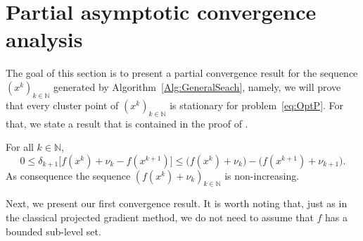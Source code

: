 \section{Partial asymptotic convergence analysis} \label{Sec:PartialConvRes}
The goal  of this section is to present a partial  convergence result for  the sequence $(x^k)_{k\in\mathbb{N}}$ generated by Algorithm~\ref{Alg:GeneralSeach}, namely, we will prove that every cluster point of $(x^k)_{k\in\mathbb{N}}$ is stationary for problem~\eqref{eq:OptP}.  For that, we state a result that is contained in the proof of \cite[Theorem 4]{GrapigliaSachs2017}.
\begin{lemma} \label{le:fkvk}
	For all $k \in \mathbb{N}$,   
	$$
	  0\leq \delta_{k+1}\big[ f(x^{k})+\nu_{k}-  f(x^{k+1})\big] \leq \big( f(x^{k})+\nu_{k}\big) - \big( f(x^{k+1})+\nu_{k+1}\big).
	$$ 
	As consequence the sequence   $\left(f(x^k)+\nu_k\right)_{k\in\mathbb{N}}$ is    non-increasing.
\end{lemma}

Next, we present our first convergence result. It is worth noting that, just as in the classical projected gradient method, we do not need to assume that $f$ has a bounded sub-level  set.

